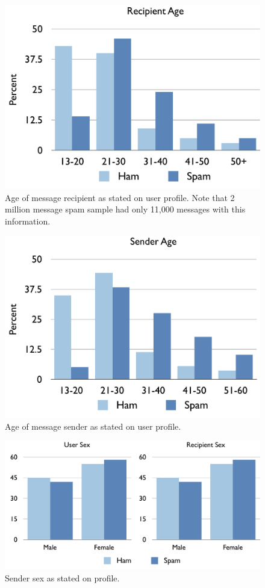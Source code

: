 \documentclass[preprint]{acm_proc_article-sp}
\begin{document}
\begin{figure}[h]
    \centering
    \includegraphics[width=\linewidth]{figures/recip-age.pdf}
    \caption{Age of message recipient as stated on user profile. Note that 2 million message spam sample 
        had only 11,000 messages with this information.}
    \label{fig:recipage}
\end{figure}

\begin{figure}[h]
    \centering
    \includegraphics[width=\linewidth]{figures/sender-age.pdf}
    \caption{Age of message sender as stated on user profile. }
    \label{fig:sendage}
\end{figure}

\begin{figure}[h]
    \centering
    \includegraphics[width=\linewidth]{figures/sex.pdf}
    \caption{Sender sex as stated on profile.}
    \label{fig:sendsex}
\end{figure}









\balancecolumns
\end{document}
